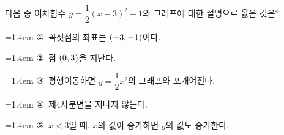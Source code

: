다음 중 이차함수 $y=\dfrac{1}{2}(x-3)^2-1$의 그래프에 대한 설명으로 옳은 것은?
\par\medskip\par\noindent\hangindent=1.4em {\small ①}\ 꼭짓점의 좌표는 $(-3{,}\mkern3mu\mathopen{}-1)$이다.\par\noindent\hangindent=1.4em {\small ②}\ 점 $(0{,}\mkern3mu\mathopen{}3)$을 지난다.\par\noindent\hangindent=1.4em {\small ③}\ 평행이동하면 $y=\dfrac{1}{2}x^2$의 그래프와 포개어진다.\par\noindent\hangindent=1.4em {\small ④}\ 제$4$사분면을 지나지 않는다.\par\noindent\hangindent=1.4em {\small ⑤}\ $x<3$일 때, $x$의 값이 증가하면 $y$의 값도 증가한다.\par\medskip
